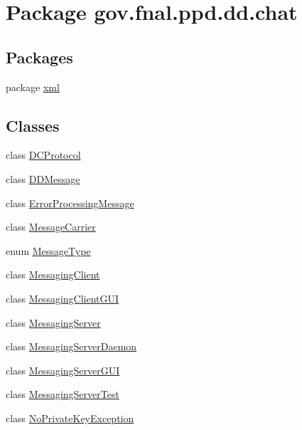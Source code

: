 \hypertarget{namespacegov_1_1fnal_1_1ppd_1_1dd_1_1chat}{\section{Package gov.\-fnal.\-ppd.\-dd.\-chat}
\label{namespacegov_1_1fnal_1_1ppd_1_1dd_1_1chat}
}
\subsection*{Packages}
\begin{DoxyCompactItemize}
\item 
package \hyperlink{namespacegov_1_1fnal_1_1ppd_1_1dd_1_1chat_1_1xml}{xml}
\end{DoxyCompactItemize}
\subsection*{Classes}
\begin{DoxyCompactItemize}
\item 
class \hyperlink{classgov_1_1fnal_1_1ppd_1_1dd_1_1chat_1_1DCProtocol}{D\-C\-Protocol}
\item 
class \hyperlink{classgov_1_1fnal_1_1ppd_1_1dd_1_1chat_1_1DDMessage}{D\-D\-Message}
\item 
class \hyperlink{classgov_1_1fnal_1_1ppd_1_1dd_1_1chat_1_1ErrorProcessingMessage}{Error\-Processing\-Message}
\item 
class \hyperlink{classgov_1_1fnal_1_1ppd_1_1dd_1_1chat_1_1MessageCarrier}{Message\-Carrier}
\item 
enum \hyperlink{enumgov_1_1fnal_1_1ppd_1_1dd_1_1chat_1_1MessageType}{Message\-Type}
\item 
class \hyperlink{classgov_1_1fnal_1_1ppd_1_1dd_1_1chat_1_1MessagingClient}{Messaging\-Client}
\item 
class \hyperlink{classgov_1_1fnal_1_1ppd_1_1dd_1_1chat_1_1MessagingClientGUI}{Messaging\-Client\-G\-U\-I}
\item 
class \hyperlink{classgov_1_1fnal_1_1ppd_1_1dd_1_1chat_1_1MessagingServer}{Messaging\-Server}
\item 
class \hyperlink{classgov_1_1fnal_1_1ppd_1_1dd_1_1chat_1_1MessagingServerDaemon}{Messaging\-Server\-Daemon}
\item 
class \hyperlink{classgov_1_1fnal_1_1ppd_1_1dd_1_1chat_1_1MessagingServerGUI}{Messaging\-Server\-G\-U\-I}
\item 
class \hyperlink{classgov_1_1fnal_1_1ppd_1_1dd_1_1chat_1_1MessagingServerTest}{Messaging\-Server\-Test}
\item 
class \hyperlink{classgov_1_1fnal_1_1ppd_1_1dd_1_1chat_1_1NoPrivateKeyException}{No\-Private\-Key\-Exception}
\end{DoxyCompactItemize}


